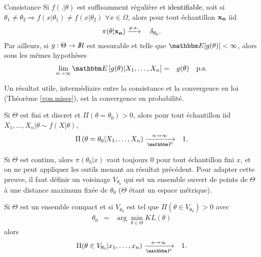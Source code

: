 \begin{theorem}{Consistance}\label{consistance.post}
Si $f(.|\theta)$ est suffisamment régulière et \textcolor{black}{identifiable}, soit si $\theta_1\neq\theta_2 \Rightarrow f(x|\theta_1)\neq f(x|\theta_2)$ $\forall x\in\Omega$, alors pour tout échantillon $\bf x_n$ iid
\begin{eqnarray*}
\pi(\theta|{\bf x_n}) & \xrightarrow{p.s.}{} & \delta_{\theta_0}.
\end{eqnarray*}
Par ailleurs, si $g:\Theta\to I\!\!R$ est mesurable et telle que $\E[g(\theta)]<\infty$, alors sous les mêmes hypothèses
\begin{eqnarray*}
\lim\limits_{n\to\infty} \E\left[g(\theta)|X_1,\ldots,X_n\right] & = & g(\theta) \ \ \ \text{p.s.}
\end{eqnarray*}
\end{theorem}

Un résultat utile, intermédiaire entre la consistance et la convergence en loi (Théorème \ref{von.mises}), est la convergence en probabilité.  

\begin{theorem}
Si $\Theta$ est fini et discret et $\Pi(\theta=\theta_0)>0$, alors pour tout échantillon iid $X_1,\ldots,X_n|\theta\sim f(X|\theta)$,
\begin{eqnarray*}
\Pi\left(\theta=\theta_0|X_1,\ldots,X_n\right) & \xrightarrow[\Pp]{n\to\infty} & 1.
\end{eqnarray*}
\end{theorem}

\if{} 
\fi
\vspace{1cm}

Si $\Theta$ est continu, alors $\pi(\theta_0|x)$ vaut toujours 0 pour tout échantillon fini $x$, et on ne peut appliquer les outils menant au résultat précédent. Pour adapter cette preuve, il faut définir un voisinage $V_{\theta_0}$ qui est un ensemble ouvert de points de $\Theta$ à une distance maximum fixée de $\theta_0$ ($\Theta$ étant un espace métrique). 

\begin{theorem}
Si $\Theta$ est un ensemble compact et si $V_{\theta_0}$ est tel que $\Pi(\theta\in V_{\theta_0})>0$ avec
\begin{eqnarray*}
\theta_0 & = & \arg\min\limits_{\theta\in\Theta} KL(\theta)
\end{eqnarray*}
alors 
\begin{eqnarray*}
\Pi(\theta\in V_{\theta_0}|x_1,\ldots,x_n) & \xrightarrow[\Pp]{n\to\infty} & 1.
\end{eqnarray*}
\end{theorem}

